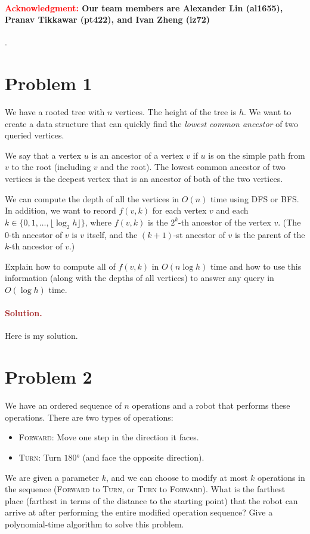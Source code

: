 \paragraph{\textcolor{red}{Acknowledgment:} Our team members are \textbf{Alexander Lin (al1655)}, \textbf{Pranav Tikkawar (pt422)}, and \textbf{Ivan Zheng (iz72)}}.


\section*{Problem 1}
We have a rooted tree with $n$ vertices. The height of the tree is $h$. We want to create a data structure that can quickly find the \emph{lowest common ancestor} of two queried vertices.

We say that a vertex $u$ is an ancestor of a vertex $v$ if $u$ is on the simple path from $v$ to the root (including $v$ and the root). The lowest common ancestor of two vertices is the deepest vertex that is an ancestor of both of the two vertices.

We can compute the depth of all the vertices in $O(n)$ time using DFS or BFS. In addition, we want to record $f(v, k)$ for each vertex $v$ and each $k \in \{0, 1, \ldots, \lfloor \log_2 h \rfloor\}$, where $f(v, k)$ is the $2^k$-th ancestor of the vertex $v$. (The $0$-th ancestor of $v$ is $v$ itself, and the $(k+1)$-st ancestor of $v$ is the parent of the $k$-th ancestor of $v$.)

Explain how to compute all of $f(v, k)$ in $O(n \log h)$ time and how to use this information (along with the depths of all vertices) to answer any query in $O(\log h)$ time.

\paragraph{\textcolor{brown}{Solution.}}
Here is my solution.


\section*{Problem 2}
We have an ordered sequence of $n$ operations and a robot that performs these operations. There are two types of operations:
\begin{itemize}
    \item \textsc{Forward}: Move one step in the direction it faces.
    \item \textsc{Turn}: Turn $\ang{180}$ (and face the opposite direction).
\end{itemize}
We are given a parameter $k$, and we can choose to modify at most $k$ operations in the sequence (\textsc{Forward} to \textsc{Turn}, or \textsc{Turn} to \textsc{Forward}). What is the farthest place (farthest in terms of the distance to the starting point) that the robot can arrive at after performing the entire modified operation sequence? Give a polynomial-time algorithm to solve this problem.

